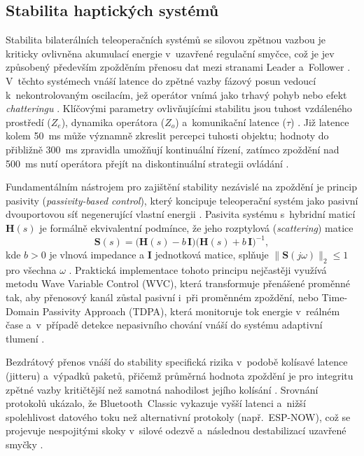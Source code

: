 \subsection{Stabilita haptických systémů}
Stabilita bilaterálních teleoperačních systémů se silovou zpětnou vazbou je kriticky ovlivněna akumulací energie v~uzavřené regulační smyčce, což je jev způsobený především zpožděním přenosu dat mezi stranami Leader a~Follower \cite{Patel2022, Black2025}.
V~těchto systémech vnáší latence do zpětné vazby fázový posun vedoucí k~nekontrolovaným oscilacím, jež operátor vnímá jako trhavý pohyb nebo efekt \textit{chatteringu} \cite{Patel2022, Black2025, GIUDICI2025}.
Klíčovými parametry ovlivňujícími stabilitu jsou tuhost vzdáleného prostředí ($Z_e$), dynamika operátora ($Z_o$) a~komunikační latence ($\tau$) \cite{Black2025}.
Již latence kolem 50~ms může významně zkreslit percepci tuhosti objektu; hodnoty do přibližně 300~ms zpravidla umožňují kontinuální řízení, zatímco zpoždění nad 500~ms nutí operátora přejít na diskontinuální strategii ovládání \cite{Patel2022, Almeida202098, Bolarinwa2022}.

Fundamentálním nástrojem pro zajištění stability nezávislé na zpoždění je princip pasivity (\textit{passivity-based control}), který koncipuje teleoperační systém jako pasivní dvouportovou síť negenerující vlastní energii \cite{Patel2022, Black2025}.
Pasivita systému s~hybridní maticí $\mathbf{H}(s)$ je formálně ekvivalentní podmínce, že jeho rozptylová (\textit{scattering}) matice
%
\begin{equation}
    \mathbf{S}(s)
    = \bigl(\mathbf{H}(s) - b\,\mathbf{I}\bigr)
      \bigl(\mathbf{H}(s) + b\,\mathbf{I}\bigr)^{-1},
\end{equation}
%
kde $b > 0$ je vlnová impedance a $\mathbf{I}$ jednotková matice, splňuje $\|\mathbf{S}(j\omega)\|_2 \leq 1$ pro všechna $\omega$ \cite{Black2025, Patel2022}.
Praktická implementace tohoto principu nejčastěji využívá metodu Wave Variable Control (WVC), která transformuje přenášené proměnné tak, aby přenosový kanál zůstal pasivní i~při proměnném zpoždění, nebo Time-Domain Passivity Approach (TDPA), která monitoruje tok energie v~reálném čase a~v~případě detekce nepasivního chování vnáší do systému adaptivní tlumení \cite{Patel2022, Bolarinwa2022}.

Bezdrátový přenos vnáší do stability specifická rizika v~podobě kolísavé latence (jitteru) a~výpadků paketů, přičemž průměrná hodnota zpoždění je pro integritu zpětné vazby kritičtější než samotná nahodilost jejího kolísání \cite{Suman2025, Aijaz2018}.
Srovnání protokolů ukázalo, že Bluetooth~Classic vykazuje vyšší latenci a~nižší spolehlivost datového toku než alternativní protokoly (např.\ ESP-NOW), což se projevuje nespojitými skoky v~silové odezvě a~následnou destabilizací uzavřené smyčky \cite{Eridani2021918, Suman2025}.

